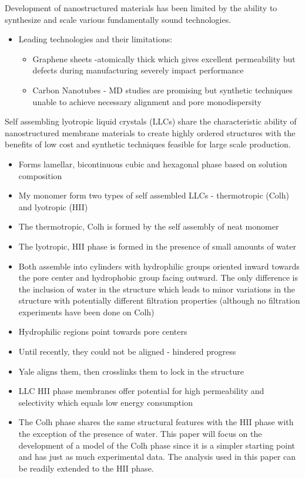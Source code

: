 \documentclass{article}
\begin{document}
	Development of nanostructured materials has been limited by the ability to synthesize and scale various fundamentally sound technologies.
	\begin{itemize}
		\item Leading technologies and their limitations:
		\begin{itemize}
			\item Graphene sheets -atomically thick which gives excellent permeability but defects during manufacturing severely impact performance
			\item Carbon Nanotubes - MD studies are promising but synthetic techniques unable to achieve necessary alignment and pore monodispersity
		\end{itemize}
	\end{itemize} 
	Self assembling lyotropic liquid crystals (LLCs) share the characteristic ability of nanostructured membrane materials to create highly ordered structures with the benefits of low cost and synthetic techniques feasible for large scale production.
	\begin{itemize}
		\item Forms lamellar, bicontinuous cubic and hexagonal phase based on solution composition
		\item My monomer form two types of self assembled LLCs - thermotropic (Colh) and lyotropic (HII)
		\item The thermotropic, Colh is formed by the self assembly of neat monomer
		\item The lyotropic, HII phase is formed in the presence of small amounts of water
		\item Both assemble into cylinders with hydrophilic groups oriented inward towards the pore center and hydrophobic group facing outward. The only difference is the inclusion of water in the structure which leads to minor variations in the structure with potentially different filtration properties (although no filtration experiments have been done on Colh)  
		\item Hydrophilic regions point towards pore centers
		\item Until recently, they could not be aligned - hindered progress
		\item Yale aligns them, then crosslinks them to lock in the structure
		\item LLC HII phase membranes offer potential for high permeability and selectivity which equals low energy consumption
		\item The Colh phase shares the same structural features with the HII phase with the exception of the presence of water. This paper will focus on the development of a model of the Colh phase since it is a simpler starting point and has just as much experimental data. The analysis used in this paper can be readily extended to the HII phase. 
	\end{itemize}
	
\end{document}
